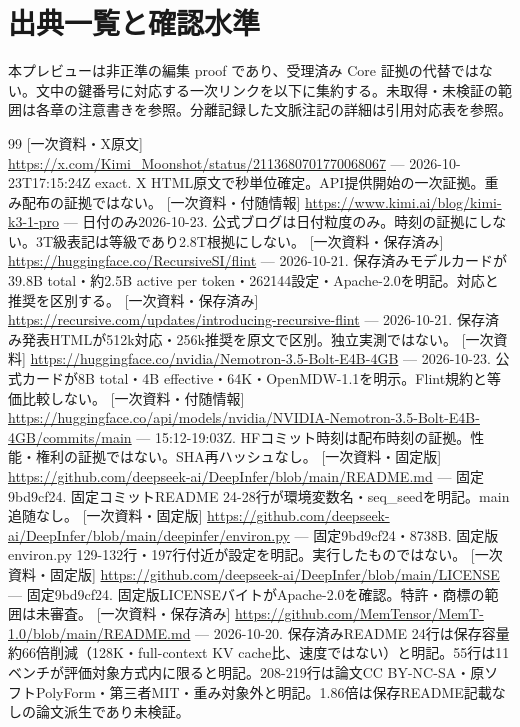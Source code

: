 \documentclass[lualatex,a4paper,10pt]{jlreq}
\begin{document}
\clearpage
\section*{出典一覧と確認水準}
本プレビューは非正準の編集 proof であり、受理済み Core 証拠の代替ではない。文中の鍵番号に対応する一次リンクを以下に集約する。未取得・未検証の範囲は各章の注意書きを参照。分離記録した文脈注記の詳細は引用対応表を参照。

{\footnotesize\setlength{\itemsep}{2pt}\setlength{\parsep}{0pt}
\begin{thebibliography}{99}
 [一次資料・X原文] \url{https://x.com/Kimi_Moonshot/status/2113680701770068067} --- 2026-10-23T17:15:24Z exact. X HTML原文で秒単位確定。API提供開始の一次証拠。重み配布の証拠ではない。
 [一次資料・付随情報] \url{https://www.kimi.ai/blog/kimi-k3-1-pro} --- 日付のみ2026-10-23. 公式ブログは日付粒度のみ。時刻の証拠にしない。3T級表記は等級であり2.8T根拠にしない。
 [一次資料・保存済み] \url{https://huggingface.co/RecursiveSI/flint} --- 2026-10-21. 保存済みモデルカードが39.8B total・約2.5B active per token・262144設定・Apache-2.0を明記。対応と推奨を区別する。
 [一次資料・保存済み] \url{https://recursive.com/updates/introducing-recursive-flint} --- 2026-10-21. 保存済み発表HTMLが512k対応・256k推奨を原文で区別。独立実測ではない。
 [一次資料] \url{https://huggingface.co/nvidia/Nemotron-3.5-Bolt-E4B-4GB} --- 2026-10-23. 公式カードが8B total・4B effective・64K・OpenMDW-1.1を明示。Flint規約と等価比較しない。
 [一次資料・付随情報] \url{https://huggingface.co/api/models/nvidia/NVIDIA-Nemotron-3.5-Bolt-E4B-4GB/commits/main} --- 15:12-19:03Z. HFコミット時刻は配布時刻の証拠。性能・権利の証拠ではない。SHA再ハッシュなし。
 [一次資料・固定版] \url{https://github.com/deepseek-ai/DeepInfer/blob/main/README.md} --- 固定9bd9cf24. 固定コミットREADME 24-28行が環境変数名・seq\_seedを明記。main追随なし。
 [一次資料・固定版] \url{https://github.com/deepseek-ai/DeepInfer/blob/main/deepinfer/environ.py} --- 固定9bd9cf24・8738B. 固定版environ.py 129-132行・197行付近が設定を明記。実行したものではない。
 [一次資料・固定版] \url{https://github.com/deepseek-ai/DeepInfer/blob/main/LICENSE} --- 固定9bd9cf24. 固定版LICENSEバイトがApache-2.0を確認。特許・商標の範囲は未審査。
 [一次資料・保存済み] \url{https://github.com/MemTensor/MemT-1.0/blob/main/README.md} --- 2026-10-20. 保存済みREADME 24行は保存容量約66倍削減（128K・full-context KV cache比、速度ではない）と明記。55行は11ベンチが評価対象方式内に限ると明記。208-219行は論文CC BY-NC-SA・原ソフトPolyForm・第三者MIT・重み対象外と明記。1.86倍は保存README記載なしの論文派生であり未検証。

\end{thebibliography}}
\end{document}
